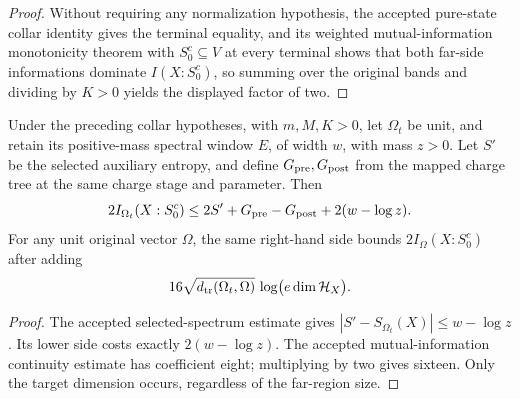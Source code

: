 \begin{proof}
    \leanok
    Without requiring any normalization hypothesis, the accepted pure-state
    collar identity gives the terminal equality, and its weighted
    mutual-information monotonicity theorem with $S_0^c\subseteq V$ at every
    terminal shows that both far-side informations dominate $I(X:S_0^c)$, so
    summing over the original bands and dividing by $K>0$ yields the displayed
    factor of two.
\end{proof}

\begin{lemma}
    \label{thm:actual-selected-collar-information}
    \leanok
    Under the preceding collar hypotheses, with $m,M,K>0$, let $\Omega_t$
    be unit, and retain its positive-mass spectral
    window $E$, of width $w$, with mass $z>0$.  Let $S'$ be the selected
    auxiliary entropy, and define $G_{\rm pre},G_{\rm post}$ from the mapped
    charge tree at the same charge stage and parameter.
    Then
    \[
        2I_{\Omega_t}(X:S_0^c)
        \leq 2S'+G_{\rm pre}-G_{\rm post}+2(w-\log z).
    \]
    For any unit original vector $\Omega$, the same right-hand side
    bounds $2I_\Omega(X:S_0^c)$ after adding
    \[
        16\sqrt{d_{\rm tr}(\Omega_t,\Omega)}\,
        \log\bigl(e\dim\mathcal H_X\bigr).
    \]
\end{lemma}

\begin{proof}
    \leanok
    The accepted selected-spectrum estimate gives
    $|S'-S_{\Omega_t}(X)|\leq w-\log z$.  Its lower side costs
    exactly $2(w-\log z)$.  The accepted mutual-information continuity
    estimate has coefficient eight; multiplying by two gives sixteen.
    Only the target dimension occurs, regardless of the far-region size.
\end{proof}


